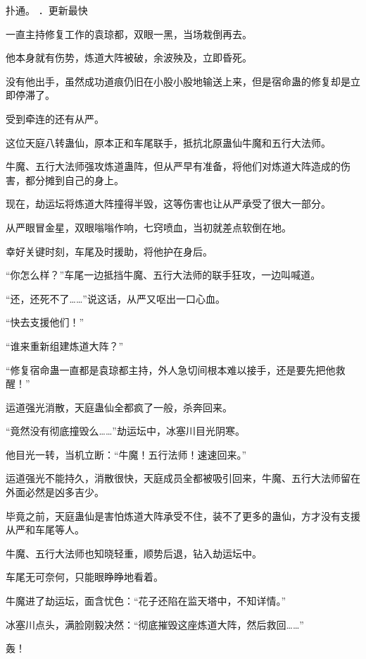 
\begin{this_body}

扑通。 ．更新最快

一直主持修复工作的袁琼都，双眼一黑，当场栽倒再去。

他本身就有伤势，炼道大阵被破，余波殃及，立即昏死。

没有他出手，虽然成功道痕仍旧在小股小股地输送上来，但是宿命蛊的修复却是立即停滞了。

受到牵连的还有从严。

这位天庭八转蛊仙，原本正和车尾联手，抵抗北原蛊仙牛魔和五行大法师。

牛魔、五行大法师强攻炼道蛊阵，但从严早有准备，将他们对炼道大阵造成的伤害，都分摊到自己的身上。

现在，劫运坛将炼道大阵撞得半毁，这等伤害也让从严承受了很大一部分。

从严眼冒金星，双眼嗡嗡作响，七窍喷血，当初就差点软倒在地。

幸好关键时刻，车尾及时援助，将他护在身后。

“你怎么样？”车尾一边抵挡牛魔、五行大法师的联手狂攻，一边叫喊道。

“还，还死不了……”说这话，从严又呕出一口心血。

“快去支援他们！”

“谁来重新组建炼道大阵？”

“修复宿命蛊一直都是袁琼都主持，外人急切间根本难以接手，还是要先把他救醒！”

运道强光消散，天庭蛊仙全都疯了一般，杀奔回来。

“竟然没有彻底撞毁么……”劫运坛中，冰塞川目光阴寒。

他目光一转，当机立断：“牛魔！五行法师！速速回来。”

运道强光不能持久，消散很快，天庭成员全都被吸引回来，牛魔、五行大法师留在外面必然是凶多吉少。

毕竟之前，天庭蛊仙是害怕炼道大阵承受不住，装不了更多的蛊仙，方才没有支援从严和车尾等人。

牛魔、五行大法师也知晓轻重，顺势后退，钻入劫运坛中。

车尾无可奈何，只能眼睁睁地看着。

牛魔进了劫运坛，面含忧色：“花子还陷在监天塔中，不知详情。”

冰塞川点头，满脸刚毅决然：“彻底摧毁这座炼道大阵，然后救回……”

轰！


\end{this_body}
